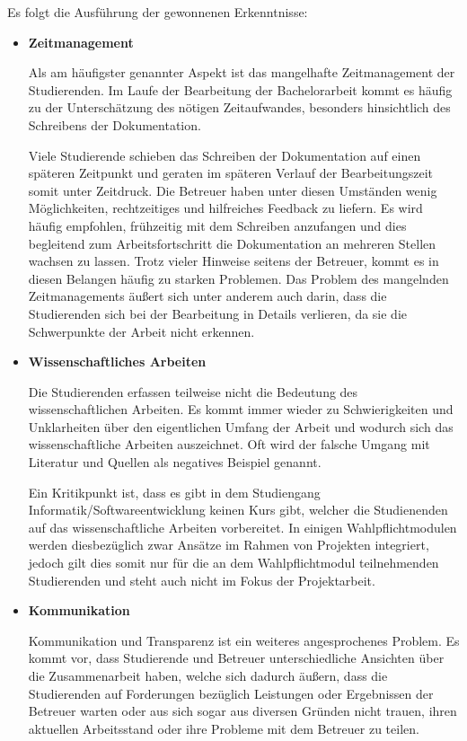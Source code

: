 \documentclass{scrreprt}
\begin{document}
\par Es folgt die Ausführung der gewonnenen Erkenntnisse:
\begin{itemize}
\item \textbf{Zeitmanagement}
\par Als am häufigster genannter Aspekt ist das mangelhafte Zeitmanagement der Studierenden. Im Laufe der Bearbeitung der Bachelorarbeit kommt es häufig zu der Unterschätzung des nötigen  Zeitaufwandes, besonders hinsichtlich des Schreibens der Dokumentation. 
\par Viele Studierende schieben das Schreiben der Dokumentation auf einen späteren Zeitpunkt und geraten im späteren Verlauf der Bearbeitungszeit somit unter Zeitdruck. Die Betreuer haben unter diesen Umständen wenig Möglichkeiten, rechtzeitiges und hilfreiches Feedback zu liefern. Es wird häufig empfohlen, frühzeitig mit dem Schreiben anzufangen und dies begleitend zum Arbeitsfortschritt die Dokumentation an mehreren Stellen wachsen zu lassen. Trotz vieler Hinweise seitens der Betreuer, kommt es in diesen Belangen häufig zu starken Problemen.
Das Problem des mangelnden Zeitmanagements äußert sich unter anderem auch darin, dass die Studierenden sich bei der Bearbeitung in Details verlieren, da sie die Schwerpunkte der Arbeit nicht erkennen.
\item \textbf{Wissenschaftliches Arbeiten}
\par Die Studierenden erfassen teilweise nicht die Bedeutung des wissenschaftlichen Arbeiten. Es kommt immer wieder zu Schwierigkeiten und Unklarheiten über den eigentlichen Umfang der Arbeit und wodurch sich das wissenschaftliche Arbeiten auszeichnet. Oft wird der falsche Umgang mit Literatur und Quellen als negatives Beispiel genannt.
\par Ein Kritikpunkt ist, dass es gibt in dem Studiengang Informatik/Softwareentwicklung keinen Kurs gibt, welcher die Studienenden auf das wissenschaftliche Arbeiten vorbereitet. In einigen Wahlpflichtmodulen werden diesbezüglich zwar Ansätze im Rahmen von Projekten integriert, jedoch gilt dies somit nur für die an dem Wahlpflichtmodul teilnehmenden Studierenden und steht auch nicht im Fokus der Projektarbeit.
\item \textbf{Kommunikation}
\par Kommunikation und Transparenz ist ein weiteres angesprochenes Problem. Es kommt vor, dass Studierende und Betreuer unterschiedliche Ansichten über die Zusammenarbeit haben, welche sich dadurch äußern, dass die Studierenden auf Forderungen bezüglich Leistungen oder Ergebnissen der Betreuer warten oder aus sich sogar aus diversen Gründen nicht trauen, ihren aktuellen Arbeitsstand oder ihre Probleme mit dem Betreuer zu teilen. 

\end{itemize}
\end{document}
